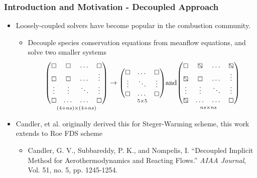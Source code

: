 \documentclass{beamer}
\begin{document}
\begin{frame}
  \frametitle{Introduction and Motivation - Decoupled Approach}
  \begin{itemize}
    \item Loosely-coupled solvers have become popular in the combustion
      community.
      \begin{itemize}
        \item Decouple species conservation equations from meanflow equations,
          and solve two smaller systems
         \[
           \underset{(4+ns) \times (4+ns)}
           {\begin{pmatrix}
             \boxempty & \boxempty & \dots  & \boxempty \\
             \boxempty & \boxempty & \dots  & \vdots \\
             \vdots    & \vdots    & \ddots & \vdots \\
             \boxempty & \dots     & \dots  & \boxempty
           \end{pmatrix}}
           \to
           \underset{5 \times 5}
           {\begin{pmatrix}
             \boxempty & \dots  & \boxempty \\
             \vdots    & \ddots & \vdots \\
             \boxempty & \dots  & \boxempty
           \end{pmatrix}}
           \text{and}
           \underset{ns \times ns}
           {\begin{pmatrix}
             \boxempty  & \boxbslash & \dots  & \boxbslash \\
             \boxbslash & \boxempty  & \dots  & \vdots \\
             \vdots     & \vdots     & \ddots & \vdots \\
             \boxbslash & \dots      & \dots  & \boxempty
           \end{pmatrix}}
         \]
    \end{itemize}
      \item Candler, et al. originally derived this for Steger-Warming scheme, this
        work extends to Roe FDS scheme
      \begin{itemize}
        \item Candler, G. V., Subbareddy, P. K., and Nompelis, I. ``Decoupled
          Implicit Method for Aerothermodynamics and Reacting Flows.'' \textit{AIAA
          Journal}, Vol. 51, no. 5, pp. 1245-1254.
      \end{itemize}
  \end{itemize}
\end{frame}
\end{document}
